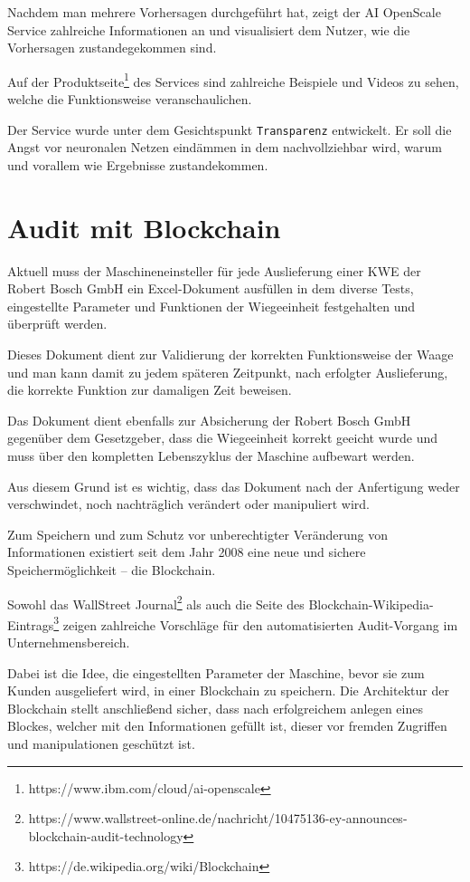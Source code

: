 Nachdem man mehrere Vorhersagen durchgeführt hat, zeigt der AI OpenScale Service zahlreiche Informationen an und
visualisiert dem Nutzer, wie die Vorhersagen zustandegekommen sind.

Auf der Produktseite\footnote{https://www.ibm.com/cloud/ai-openscale} des Services sind zahlreiche Beispiele und Videos
zu sehen, welche die Funktionsweise veranschaulichen.

Der Service wurde unter dem Gesichtspunkt \texttt{Transparenz} entwickelt. Er soll die Angst vor neuronalen Netzen
eindämmen in dem nachvollziehbar wird, warum und vorallem wie Ergebnisse zustandekommen.

\section{Audit mit Blockchain}
Aktuell muss der Maschineneinsteller für jede Auslieferung einer KWE der Robert Bosch GmbH ein Excel-Dokument ausfüllen
in dem diverse Tests, eingestellte Parameter und Funktionen der Wiegeeinheit festgehalten und überprüft werden.

Dieses Dokument dient zur Validierung der korrekten Funktionsweise der Waage und man kann damit zu jedem späteren
Zeitpunkt, nach erfolgter Auslieferung, die korrekte Funktion zur damaligen Zeit beweisen.

Das Dokument dient ebenfalls zur Absicherung der Robert Bosch GmbH gegenüber dem Gesetzgeber, dass die Wiegeeinheit
korrekt geeicht wurde und muss über den kompletten Lebenszyklus der Maschine aufbewart werden.

Aus diesem Grund ist es wichtig, dass das Dokument nach der Anfertigung weder verschwindet, noch nachträglich verändert
oder manipuliert wird.

Zum Speichern und zum Schutz vor unberechtigter Veränderung von Informationen existiert seit dem Jahr 2008 eine neue
und sichere Speichermöglichkeit -- die Blockchain.

Sowohl das WallStreet
Journal\footnote{https://www.wallstreet-online.de/nachricht/10475136-ey-announces-blockchain-audit-technology} als auch
die Seite des Blockchain-Wikipedia-Eintrags\footnote{https://de.wikipedia.org/wiki/Blockchain} zeigen zahlreiche
Vorschläge für den automatisierten Audit-Vorgang im Unternehmensbereich.

Dabei ist die Idee, die eingestellten Parameter der Maschine, bevor sie zum Kunden ausgeliefert wird, in einer
Blockchain zu speichern. Die Architektur der Blockchain stellt anschließend sicher, dass nach erfolgreichem anlegen
eines Blockes, welcher mit den Informationen gefüllt ist, dieser vor fremden Zugriffen und manipulationen geschützt ist.

